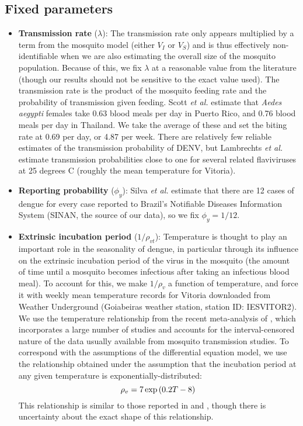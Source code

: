 \documentclass[12pt,letterpaper]{article}
\begin{document}
\subsection*{Fixed parameters}

\begin{itemize}
\item \textbf{Transmission rate} ($\lambda$): The transmission rate only appears multiplied by a term from the mosquito model (either $V_I$ or $V_S$) and is thus effectively non-identifiable when we are also estimating the overall size of the mosquito population.
Because of this, we fix $\lambda$ at a reasonable value from the literature (though our results should not be sensitive to the exact value used).
The transmission rate is the product of the mosquito feeding rate and the probability of transmission given feeding.
Scott \textit{et al.} \cite{Scott2000} estimate that \textit{Aedes aegypti} females take 0.63 blood meals per day in Puerto Rico, and 0.76 blood meals per day in Thailand.
We take the average of these and set the biting rate at 0.69 per day, or 4.87 per week.
There are relatively few reliable estimates of the transmission probability of DENV, but Lambrechts \textit{et al.} \cite{Lambrechts2011} estimate transmission probabilities close to one  for several related flaviviruses at 25 degrees C (roughly the mean temperature for Vitoria).
\\
\item \textbf{Reporting probability} ($\phi_y$): Silva \textit{et al.} \cite{Silva2016} estimate that there are 12 cases of dengue for every case reported to Brazil's Notifiable Diseases Information System (SINAN, the source of our data), so we fix $\phi_y = 1/12$.
\\
\item \textbf{Extrinsic incubation period} ($1/\rho_{vt}$): Temperature is thought to play an important role in the seasonality of dengue, in particular through its influence on the extrinsic incubation period of the virus in the mosquito  (the amount of time until a mosquito becomes infectious after taking an infectious blood meal).
To account for this, we make $1/\rho_v$ a function of temperature, and force it with weekly mean temperature records for Vitoria downloaded from Weather Underground (Goiabeiras weather station, station ID: IESVITOR2).
We use the temperature relationship from the recent meta-analysis of \cite{Chan2012}, which incorporates a large number of studies and accounts for the interval-censored nature of the data usually available from mosquito transmission studies.
To correspond with the assumptions of the differential equation model, we use the relationship obtained under the assumption that the incubation period at any given temperature is exponentially-distributed:
\begin{equation}
\rho_v = 7\exp \left(0.2T - 8\right)\\
\end{equation}
This relationship is similar to those reported in \cite{Focks1995} and \cite{Tjaden2013}, though there is uncertainty about the exact shape of this relationship.
\end{itemize}
\end{document}

